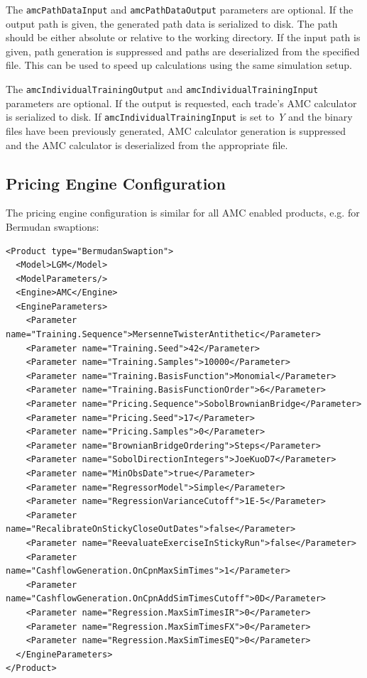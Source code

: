 \documentclass[12pt, a4paper]{article}
\begin{document}
The \verb+amcPathDataInput+ and \verb+amcPathDataOutput+ parameters are optional. If the output path is given, the
generated path data is serialized to disk. The path should be either absolute or relative to the working directory. If
the input path is given, path generation is suppressed and paths are deserialized from the specified file. This can be
used to speed up calculations using the same simulation setup.

The \verb+amcIndividualTrainingOutput+ and \verb+amcIndividualTrainingInput+ parameters are optional. If the output is requested, each trade's
AMC calculator is serialized to disk. If \verb+amcIndividualTrainingInput+ is set to \emph{Y} and the binary files have been previously generated, 
AMC calculator generation is suppressed and the AMC calculator is deserialized from the appropriate file.

\subsection{Pricing Engine Configuration}\label{sec:pricing_engine_config}

The pricing engine configuration is similar for all AMC enabled products, e.g. for Bermudan swaptions:

\begin{verbatim}
<Product type="BermudanSwaption">
  <Model>LGM</Model>
  <ModelParameters/>
  <Engine>AMC</Engine>
  <EngineParameters>
    <Parameter name="Training.Sequence">MersenneTwisterAntithetic</Parameter>
    <Parameter name="Training.Seed">42</Parameter>
    <Parameter name="Training.Samples">10000</Parameter>
    <Parameter name="Training.BasisFunction">Monomial</Parameter>
    <Parameter name="Training.BasisFunctionOrder">6</Parameter>
    <Parameter name="Pricing.Sequence">SobolBrownianBridge</Parameter>
    <Parameter name="Pricing.Seed">17</Parameter>
    <Parameter name="Pricing.Samples">0</Parameter>
    <Parameter name="BrownianBridgeOrdering">Steps</Parameter>
    <Parameter name="SobolDirectionIntegers">JoeKuoD7</Parameter>
    <Parameter name="MinObsDate">true</Parameter>
    <Parameter name="RegressorModel">Simple</Parameter>
    <Parameter name="RegressionVarianceCutoff">1E-5</Parameter>
    <Parameter name="RecalibrateOnStickyCloseOutDates">false</Parameter>
    <Parameter name="ReevaluateExerciseInStickyRun">false</Parameter>
    <Parameter name="CashflowGeneration.OnCpnMaxSimTimes">1</Parameter>
    <Parameter name="CashflowGeneration.OnCpnAddSimTimesCutoff">0D</Parameter>
    <Parameter name="Regression.MaxSimTimesIR">0</Parameter>
    <Parameter name="Regression.MaxSimTimesFX">0</Parameter>
    <Parameter name="Regression.MaxSimTimesEQ">0</Parameter>
  </EngineParameters>
</Product>
\end{verbatim}
\end{document}
